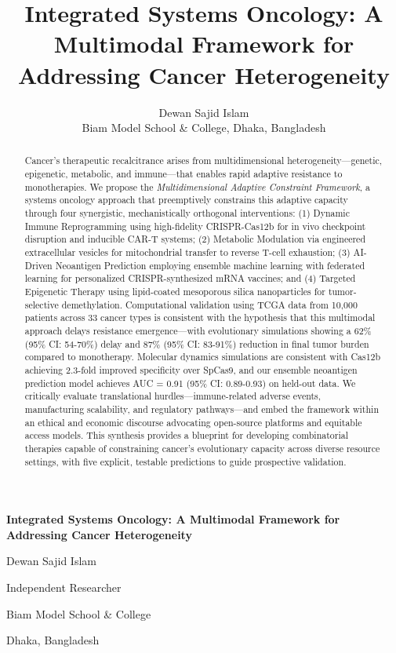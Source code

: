 \documentclass[12pt,a4paper]{article}
\title{\textbf{Integrated Systems Oncology: A Multimodal Framework for Addressing Cancer Heterogeneity}}
\author{Dewan Sajid Islam\orcidlink{0009-0008-8784-8480} \\ Biam Model School \& College, Dhaka, Bangladesh}
\date{}
\begin{document}
\pagestyle{empty}

    \centering
    \vspace*{2cm}
    {\LARGE\bfseries Integrated Systems Oncology: A Multimodal Framework for Addressing Cancer Heterogeneity\par}
    \vspace{1.5cm}
    {\Large Dewan Sajid Islam\par}
    \vspace{0.3cm}
    {Independent Researcher\par}
    \vspace{0.3cm}
    {Biam Model School \& College\par}
    \vspace{0.1cm}
    {Dhaka, Bangladesh\par}
    \vspace{2cm}

    
    \begin{abstract}
        \noindent Cancer's therapeutic recalcitrance arises from multidimensional heterogeneity—genetic, epigenetic, metabolic, and immune—that enables rapid adaptive resistance to monotherapies. We propose the \textit{Multidimensional Adaptive Constraint Framework}, a systems oncology approach that preemptively constrains this adaptive capacity through four synergistic, mechanistically orthogonal interventions: (1) Dynamic Immune Reprogramming using high-fidelity CRISPR-Cas12b for in vivo checkpoint disruption and inducible CAR-T systems; (2) Metabolic Modulation via engineered extracellular vesicles for mitochondrial transfer to reverse T-cell exhaustion; (3) AI-Driven Neoantigen Prediction employing ensemble machine learning with federated learning for personalized CRISPR-synthesized mRNA vaccines; and (4) Targeted Epigenetic Therapy using lipid-coated mesoporous silica nanoparticles for tumor-selective demethylation. Computational validation using TCGA data from 10,000 patients across 33 cancer types is consistent with the hypothesis that this multimodal approach delays resistance emergence—with evolutionary simulations showing a 62\% (95\% CI: 54-70\%) delay and 87\% (95\% CI: 83-91\%) reduction in final tumor burden compared to monotherapy. Molecular dynamics simulations are consistent with Cas12b achieving 2.3-fold improved specificity over SpCas9, and our ensemble neoantigen prediction model achieves AUC = 0.91 (95\% CI: 0.89-0.93) on held-out data. We critically evaluate translational hurdles—immune-related adverse events, manufacturing scalability, and regulatory pathways—and embed the framework within an ethical and economic discourse advocating open-source platforms and equitable access models. This synthesis provides a blueprint for developing combinatorial therapies capable of constraining cancer's evolutionary capacity across diverse resource settings, with five explicit, testable predictions to guide prospective validation.
    \end{abstract}
\end{document}
